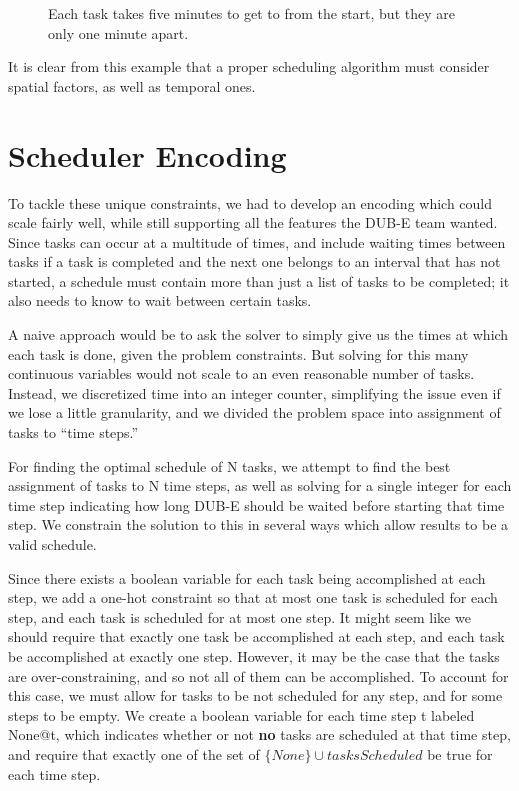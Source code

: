 \documentclass[11pt]{article}
\begin{document}
\begin{figure}
  \caption{
    Each task takes five minutes
    to get to from the start,
    but they are only one minute apart.
  }
  \label{fig:overview-example}
\end{figure}

It is clear from this example that
a proper scheduling algorithm must consider spatial factors,
as well as temporal ones.

\section{Scheduler Encoding}
To tackle these unique constraints,
we had to develop an encoding which could scale fairly well,
while still supporting all the features the DUB-E team wanted.
Since tasks can occur at a multitude of times,
and include waiting times between tasks
if a task is completed and the next one
belongs to an interval that has not started,
a schedule must contain more than just a list of tasks to be completed;
it also needs to know to wait between certain tasks.

A naive approach would be to ask the solver
to simply give us the times at which each task is done,
given the problem constraints.
But solving for this many continuous variables
would not scale to an even reasonable number of tasks.
Instead, we discretized time into an integer counter,
simplifying the issue even if we lose a little granularity,
and we divided the problem space into assignment of tasks
to ``time steps.''

For finding the optimal schedule of N tasks,
we attempt to find the best assignment
of tasks to N time steps,
as well as solving for a single integer for each time step
indicating how long DUB-E should be waited before starting that time step.
We constrain the solution to this in several ways
which allow results to be a valid schedule.

Since there exists a boolean variable for
each task being accomplished at each step,
we add a one-hot constraint
so that at most one task is scheduled for each step,
and each task is scheduled for at most one step.
It might seem like we should require that
exactly one task be accomplished at each step,
and each task be accomplished at exactly one step.
However, it may be the case that
the tasks are over-constraining,
and so not all of them can be accomplished.
To account for this case,
we must allow for tasks to be not scheduled for any step,
and for some steps to be empty.
We create a boolean variable for each time step t labeled None@t,
which indicates whether or not \textbf{no} tasks are scheduled at that time step,
and require that exactly one of the set of $\{None\} \cup tasksScheduled$
be true for each time step.
\end{document}
